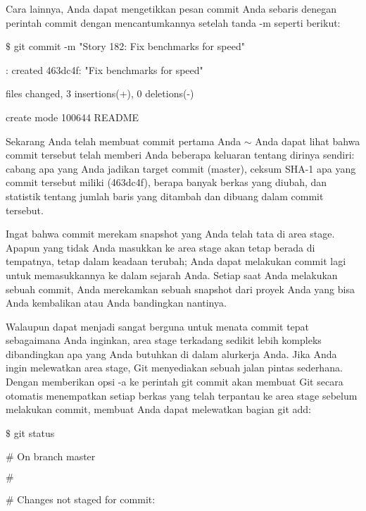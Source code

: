 \noindent 
Cara lainnya, Anda dapat mengetikkan pesan commit Anda sebaris denegan perintah commit dengan mencantumkannya setelah tanda -m seperti berikut: \par
\vspace{12pt}
\vspace{12pt}
\noindent 
 $  \$  $ git commit -m "Story 182: Fix benchmarks for speed" \par
\noindent 
[master]: created 463dc4f: "Fix benchmarks for speed" \par
{} files changed, 3 insertions(+), 0 deletions(-) \par
\noindent 
 create mode 100644 README \par
\vspace{12pt}
\vspace{12pt}
\noindent 
Sekarang Anda telah membuat commit pertama Anda $  \sim  $ Anda dapat lihat bahwa commit tersebut telah memberi Anda beberapa keluaran tentang dirinya sendiri: cabang apa yang Anda jadikan target commit (master), ceksum SHA-1 apa yang commit tersebut miliki (463dc4f), berapa banyak berkas yang diubah, dan statistik tentang jumlah baris yang ditambah dan dibuang dalam commit tersebut. \par
\noindent 
Ingat bahwa commit merekam snapshot yang Anda telah tata di area stage. Apapun yang tidak Anda masukkan ke area stage akan tetap berada di tempatnya, tetap dalam keadaan terubah; Anda dapat melakukan commit lagi untuk memasukkannya ke dalam sejarah Anda. Setiap saat Anda melakukan sebuah commit, Anda merekamkan sebuah snapshot dari proyek Anda yang bisa Anda kembalikan atau Anda bandingkan nantinya. \par
\noindent 
Walaupun dapat menjadi sangat berguna untuk menata commit tepat sebagaimana Anda inginkan, area stage terkadang sedikit lebih kompleks dibandingkan apa yang Anda butuhkan di dalam alurkerja Anda. Jika Anda ingin melewatkan area stage, Git menyediakan sebuah jalan pintas sederhana. Dengan memberikan opsi -a ke perintah git commit akan membuat Git secara otomatis menempatkan setiap berkas yang telah terpantau ke area stage sebelum melakukan commit, membuat Anda dapat melewatkan bagian git add: \par
\vspace{12pt}
\noindent 
 $  \$  $ git status \par
\noindent 
 $  \#  $ On branch master \par
\noindent 
 $  \#  $ \par
\noindent 
 $  \#  $ Changes not staged for commit: \par
